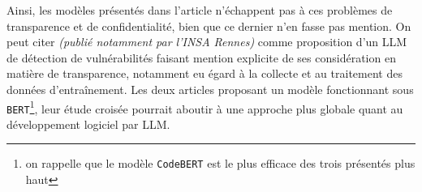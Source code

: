                     Ainsi, les modèles présentés dans l'article n'échappent pas à ces problèmes de
                    transparence et de confidentialité, bien que ce dernier n'en fasse pas
                    mention. On peut citer \cite{rennes}
                    \textit{(publié notamment par l'INSA Rennes)} comme proposition d'un LLM de détection de
                    vulnérabilités faisant mention explicite de ses considération en matière de transparence,
                    notamment eu égard à la collecte et au traitement des données
                    d'entraînement. Les deux articles proposant un modèle fonctionnant sous \texttt{BERT}\footnote{on rappelle que le modèle \texttt{CodeBERT} est le plus efficace des trois présentés plus haut}, leur étude croisée pourrait aboutir à une approche plus globale quant au développement logiciel par LLM.